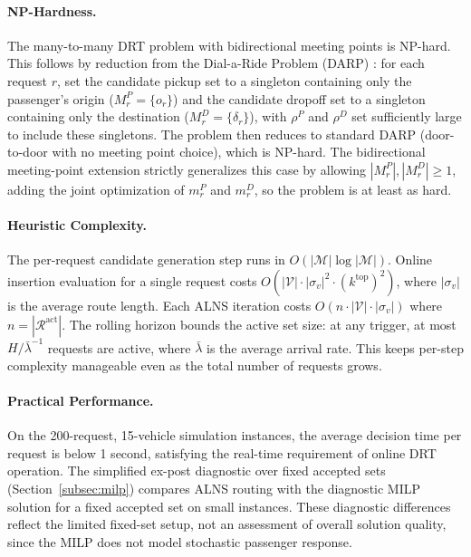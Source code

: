 \paragraph{NP-Hardness.}
The many-to-many DRT problem with bidirectional meeting points is NP-hard. This follows
by reduction from the Dial-a-Ride Problem (DARP) \citep{cordeau2007}: for each request
$r$, set the candidate pickup set to a singleton containing only the passenger's origin
($M_r^P = \{o_r\}$) and the candidate dropoff set to a singleton containing only the
destination ($M_r^D = \{\delta_r\}$), with $\rho^P$ and $\rho^D$ set sufficiently large
to include these singletons. The problem then reduces to standard DARP (door-to-door
with no meeting point choice), which is NP-hard. The bidirectional meeting-point
extension strictly generalizes this case by allowing $|M_r^P|, |M_r^D| \geq 1$, adding
the joint optimization of $m_r^P$ and $m_r^D$, so the problem is at least as hard.

\paragraph{Heuristic Complexity.}
The per-request candidate generation step runs in $O(|\mathcal{M}| \log |\mathcal{M}|)$.
Online insertion evaluation for a single request costs
$O(|\mathcal{V}| \cdot |\sigma_v|^2 \cdot (k^{\text{top}})^2)$, where $|\sigma_v|$ is
the average route length. Each ALNS iteration costs
$O(n \cdot |\mathcal{V}| \cdot |\sigma_v|)$ where $n = |\mathcal{R}^{\text{act}}|$.
The rolling horizon bounds the active set size: at any trigger, at most
$H / \bar{\lambda}^{-1}$ requests are active, where $\bar{\lambda}$ is the average
arrival rate. This keeps per-step complexity manageable even as the total number of
requests grows.

\paragraph{Practical Performance.}
On the 200-request, 15-vehicle simulation instances, the average decision time per
request is below 1 second, satisfying the real-time requirement of online DRT operation.
The simplified ex-post diagnostic over fixed accepted sets (Section~\ref{subsec:milp})
compares ALNS routing with the diagnostic MILP solution for a fixed accepted set on small
instances. These diagnostic differences reflect the limited fixed-set setup, not an
assessment of overall solution quality, since the MILP does not model stochastic
passenger response.
